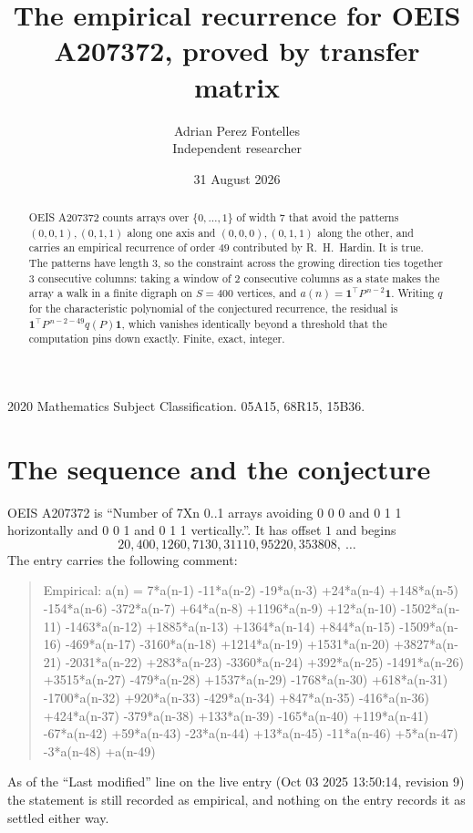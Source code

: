 \documentclass[11pt,a4paper]{article}
\title{The empirical recurrence for OEIS A207372, proved by transfer matrix}
\author{Adrian Perez Fontelles\\ \small Independent researcher}
\date{31 August 2026}
\theoremstyle{plain}
\theoremstyle{definition}
\begin{document}
\maketitle

\begin{abstract}
OEIS A207372 counts arrays over $\{0,\dots,1\}$ of width $7$ that avoid the patterns
$(0,0,1), (0,1,1)$ along one axis and $(0,0,0), (0,1,1)$ along the other, and carries an empirical recurrence of
order $49$ contributed by R.~H.~Hardin. It is true. The patterns have length $3$, so
the constraint across the growing direction ties together $3$ consecutive columns: taking a
window of $2$ consecutive columns as a state makes the array a walk in a finite digraph
on $S=400$ vertices, and $a(n)=\mathbf{1}^{\!\top}P^{\,n-2}\mathbf{1}$. Writing $q$
for the characteristic polynomial of the conjectured recurrence, the residual is
$\mathbf{1}^{\!\top}P^{\,n-2-49}q(P)\mathbf{1}$, which vanishes identically
beyond a threshold that the computation pins down exactly. Finite, exact, integer.
\end{abstract}

\noindent\small 2020 Mathematics Subject Classification. 05A15, 68R15, 15B36.\normalsize

\section{The sequence and the conjecture}

OEIS A207372 is ``Number of 7Xn 0..1 arrays avoiding 0 0 0 and 0 1 1 horizontally and 0 0 1 and 0 1 1 vertically.''. It has offset
$1$ and begins
\[
20, 400, 1260, 7130, 31110, 95220, 353808,\ \dots
\]
The entry carries the following comment:
\begin{quote}\small
Empirical: a(n) = 7*a(n-1) -11*a(n-2) -19*a(n-3) +24*a(n-4) +148*a(n-5) -154*a(n-6) -372*a(n-7) +64*a(n-8) +1196*a(n-9) +12*a(n-10) -1502*a(n-11) -1463*a(n-12) +1885*a(n-13) +1364*a(n-14) +844*a(n-15) -1509*a(n-16) -469*a(n-17) -3160*a(n-18) +1214*a(n-19) +1531*a(n-20) +3827*a(n-21) -2031*a(n-22) +283*a(n-23) -3360*a(n-24) +392*a(n-25) -1491*a(n-26) +3515*a(n-27) -479*a(n-28) +1537*a(n-29) -1768*a(n-30) +618*a(n-31) -1700*a(n-32) +920*a(n-33) -429*a(n-34) +847*a(n-35) -416*a(n-36) +424*a(n-37) -379*a(n-38) +133*a(n-39) -165*a(n-40) +119*a(n-41) -67*a(n-42) +59*a(n-43) -23*a(n-44) +13*a(n-45) -11*a(n-46) +5*a(n-47) -3*a(n-48) +a(n-49)
\end{quote}
As of the ``Last modified'' line on the live entry (Oct 03 2025 13:50:14, revision
9) the statement is still recorded as empirical, and nothing on the entry
records it as settled either way.
\end{document}
